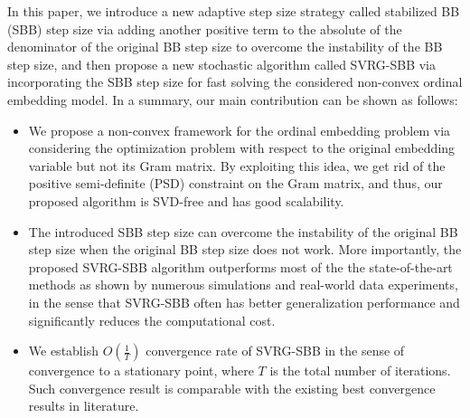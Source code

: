 \documentclass[letterpaper]{article} %
\begin{document}
In this paper, we introduce a new adaptive step size strategy called stabilized BB (SBB) step size via adding another positive term to the absolute of the denominator of the original BB step size to overcome the instability of the BB step size, and then propose a new stochastic algorithm called SVRG-SBB via incorporating the SBB step size for fast solving the considered non-convex ordinal embedding model. In a summary, our main contribution can be shown as follows:	
\begin{itemize}
\item
We propose a non-convex framework for the ordinal embedding problem via considering the optimization problem with respect to the original embedding variable but not its Gram matrix. By exploiting this idea, we get rid of the positive semi-definite (PSD) constraint on the Gram matrix, and thus, our proposed algorithm is SVD-free and has good scalability. %

\item
The introduced SBB step size can overcome the instability of the original BB step size when the original BB step size does not work. More importantly, the proposed SVRG-SBB algorithm outperforms most of the the state-of-the-art methods as shown by numerous simulations and real-world data experiments, in the sense that SVRG-SBB often has better generalization performance and significantly reduces the computational cost.

\item We establish $O(\frac{1}{T})$ convergence rate of SVRG-SBB in the sense of convergence to a stationary point, where $T$ is the total number of iterations. Such convergence result is comparable with the existing best convergence results in literature.
\end{itemize}


\end{document}
